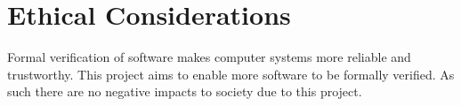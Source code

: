 \chapter{Ethical Considerations}

Formal verification of software makes computer systems more reliable and trustworthy. This project aims to enable more
software to be formally verified. As such there are no negative impacts to society due to this project.